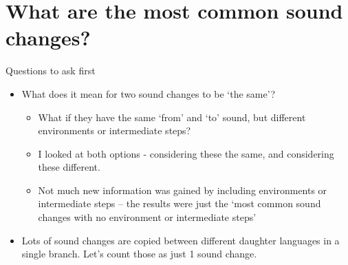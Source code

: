 \documentclass[10pt]{beamer}
\begin{document}
  \section*{What are the most common sound changes?}
  \begin{frame}{Questions to ask first}
    \begin{itemize}
      \item What does it mean for two sound changes to be `the same'?
      \begin{itemize}
        \item What if they have the same `from' and `to' sound, but different environments or intermediate steps?
        \item I looked at both options - considering these the same, and considering these different.
        \item Not much new information was gained by including environments or intermediate steps -- the results were just the `most common sound changes with no environment or intermediate steps'
      \end{itemize}
      \item Lots of sound changes are copied between different daughter languages in a single branch. Let's count those as just 1 sound change.
    \end{itemize}
  \end{frame}
\end{document}
